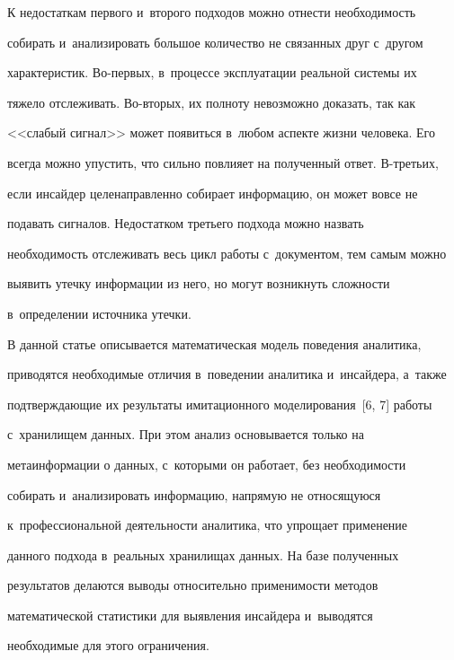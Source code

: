   


  К недостаткам первого и~второго подходов можно отнести необходимость 


собирать и~анализировать большое количество не связанных друг с~другом 


характеристик. Во-пер\-вых, в~процессе эксплуатации реальной системы их 


тяжело отслеживать. Во-вто\-рых, их полноту невозможно доказать, так как 


<<слабый сигнал>> может появиться в~любом аспекте жизни человека. Его 


всегда можно упустить, что сильно повлияет на полученный ответ. В-треть\-их, 


если инсайдер целенаправленно собирает информацию, он может вовсе не 


подавать сигналов. Недостатком третьего подхода можно назвать 


необходимость отслеживать весь цикл работы с~документом, тем самым можно 


выявить утечку информации из него, но могут возникнуть сложности 


в~определении источника утечки.


  


  В данной статье описывается математическая модель поведения аналитика, 


приводятся необходимые отличия в~поведении аналитика и~инсайдера, а~также 


подтверждающие их результаты имитационного моделирования~[6, 7] работы 


с~хранилищем данных. При этом анализ основывается только на 


метаинформации о данных, с~которыми он работает, без необходимости 


собирать и~анализировать информацию, напрямую не относящуюся 


к~профессиональной деятельности аналитика, что упрощает применение 


данного подхода в~реальных хранилищах данных. На базе полученных 


результатов делаются выводы относительно применимости методов 


математической статистики для выявления инсайдера и~выводятся 


необходимые для этого ограничения. 


    


\vspace*{-3pt}    





